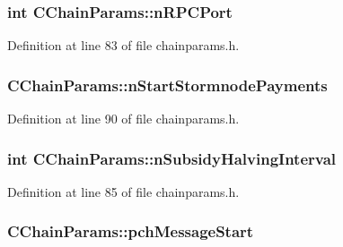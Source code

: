 \subsubsection[{n\+R\+P\+C\+Port}]{\setlength{\rightskip}{0pt plus 5cm}int C\+Chain\+Params\+::n\+R\+P\+C\+Port\hspace{0.3cm}{\ttfamily [protected]}}\label{class_c_chain_params_a0f7d46a1493876d522cb594cc8e7924f}


Definition at line 83 of file chainparams.\+h.

\hypertarget{class_c_chain_params_a585cae2a6611f610e2ff269a8e9ada34}{}
\subsubsection[{n\+Start\+Stormnode\+Payments}]{ C\+Chain\+Params\+::n\+Start\+Stormnode\+Payments\hspace{0.3cm}{\ttfamily [protected]}}\label{class_c_chain_params_a585cae2a6611f610e2ff269a8e9ada34}


Definition at line 90 of file chainparams.\+h.

\hypertarget{class_c_chain_params_a8618df6217285a39e86d44fba35a21af}{}
\subsubsection[{n\+Subsidy\+Halving\+Interval}]{\setlength{\rightskip}{0pt plus 5cm}int C\+Chain\+Params\+::n\+Subsidy\+Halving\+Interval\hspace{0.3cm}{\ttfamily [protected]}}\label{class_c_chain_params_a8618df6217285a39e86d44fba35a21af}


Definition at line 85 of file chainparams.\+h.

\hypertarget{class_c_chain_params_a06130a926927697ae8a6c211a60233a7}{}
\subsubsection[{pch\+Message\+Start}]{ C\+Chain\+Params\+::pch\+Message\+Start\hspace{0.3cm}{\ttfamily [protected]}}\label{class_c_chain_params_a06130a926927697ae8a6c211a60233a7}


